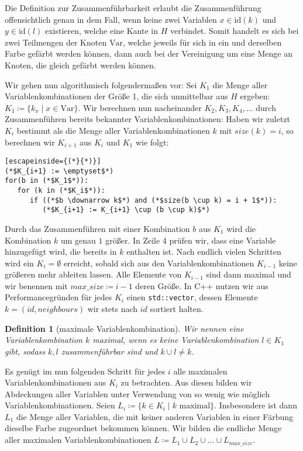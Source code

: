 \documentclass[a4paper]{article}
\newtheorem{definition}[satz]{Definition} %
\theoremstyle{nonumberplain}
\begin{document}
Die Definition zur Zusammenführbarkeit erlaubt die Zusammenführung offensichtlich genau in dem Fall, wenn keine zwei Variablen $x \in \mathrm{id}(k)$ und $y \in \mathrm{id}(l)$ existieren, welche eine Kante in $H$ verbindet. Somit handelt es sich bei zwei Teilmengen der Knoten $\mathrm{Var}$, welche jeweils für sich in ein und derselben Farbe gefärbt werden können, dann auch bei der Vereinigung um eine Menge an Knoten, die gleich gefärbt werden können.

Wir gehen nun algorithmisch folgendermaßen vor:
Sei $K_1$ die Menge aller Variablenkombinationen der Größe 1, die sich unmittelbar aus $H$ ergeben: $K_1 \coloneqq \{k_x \mid x\in \mbox{Var} \}$.
Wir berechnen nun nacheinander $K_2, K_3, K_4, \dots $ durch Zusammenführen bereits bekannter Variablenkombinationen: Haben wir zuletzt $K_i$ bestimmt als die Menge aller Variablenkombinationen $k$ mit $size(k) = i$, so berechnen wir $K_{i+1}$ aus $K_i$ und $K_1$ wie folgt:

\begin{lstlisting}[escapeinside={(*}{*)}]
(*$K_{i+1} := \emptyset$*)
for(b in (*$K_1$*)):
   for (k in (*$K_i$*)):
      if ((*$b \downarrow k$*) and (*$size(b \cup k) = i + 1$*)):
         (*$K_{i+1} := K_{i+1} \cup (b \cup k)$*)
\end{lstlisting}

Durch das Zusammenführen mit einer Kombination $b$ aus $K_1$ wird die Kombination $k$ um genau $1$ größer. In Zeile 4 prüfen wir, dass eine Variable hinzugefügt wird, die bereits in $k$ enthalten ist.
Nach endlich vielen Schritten wird ein $K_i = \emptyset$ erreicht, sobald sich aus den Variablenkombinationen $K_{i-1}$ keine größeren mehr ableiten lassen. Alle Elemente von $K_{i-1}$ sind dann maximal und wir benennen mit $max\_size \coloneqq i-1$ deren Größe. In C++ nutzen wir aus Performancegründen für jedes $K_i$ einen \texttt{std::vector}, dessen Elemente $k=(id,neighbours)$ wir stets nach $id$ sortiert halten.

\begin{definition}[maximale Variablenkombination]
	Wir nennen eine Variablenkombination $k$ maximal, wenn es keine Variablenkombination $l\in K_1$ gibt, sodass $k, l$ zusammenführbar sind und $k \cup l \neq k$.
\end{definition}

Es genügt im nun folgenden Schritt für jedes $i$ alle maximalen Variablenkombinationen aus $K_i$ zu betrachten. Aus diesen bilden wir Abdeckungen aller Variablen unter Verwendung von so wenig wie möglich Variablenkombinationen.
Seien $L_i \coloneqq \{k \in K_i \mid k \text{ maximal} \}$. Insbesondere ist dann $L_1$ die Menge aller Variablen, die mit keiner anderen Variablen in einer Färbung dieselbe Farbe zugeordnet bekommen können.
Wir bilden die endliche Menge aller maximalen Variablenkombinationen $L \coloneqq L_1 \cup L_2 \cup \dots \cup L_{max\_size}$. %
\end{document}
